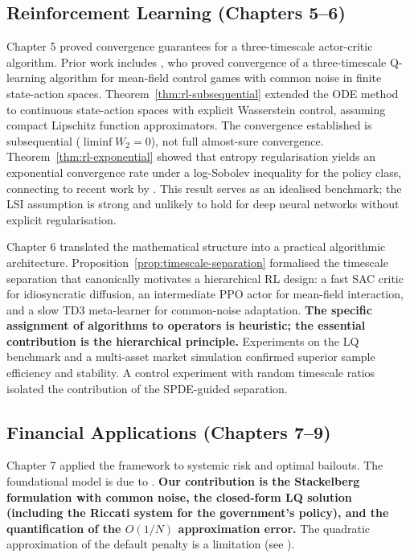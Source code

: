 \subsection{Reinforcement Learning (Chapters 5--6)}

Chapter 5 proved convergence guarantees for a three-timescale actor-critic
algorithm. Prior work includes \citep{angiulietal2024}, who
proved convergence of a three-timescale Q-learning algorithm for mean-field control
games with common noise in finite state-action spaces.
Theorem~\ref{thm:rl-subsequential} extended the ODE method to continuous
state-action spaces with explicit Wasserstein control, assuming compact Lipschitz
function approximators. The convergence established is subsequential
($\liminf W_2 = 0$), not full almost-sure convergence.
Theorem~\ref{thm:rl-exponential} showed that entropy regularisation yields an
exponential convergence rate under a log-Sobolev inequality for the policy class,
connecting to recent work by \citep{malizhang2024}. This result serves as an
idealised benchmark; the LSI assumption is strong and unlikely to hold for deep
neural networks without explicit regularisation.

Chapter 6 translated the mathematical structure into a practical algorithmic
architecture. Proposition~\ref{prop:timescale-separation} formalised the timescale
separation that canonically motivates a hierarchical RL design: a fast SAC critic
for idiosyncratic diffusion, an intermediate PPO actor for mean-field interaction,
and a slow TD3 meta-learner for common-noise adaptation. \textbf{The specific
assignment of algorithms to operators is heuristic; the essential contribution is
the hierarchical principle.} Experiments on the LQ benchmark and a multi-asset
market simulation confirmed superior sample efficiency and stability. A control
experiment with random timescale ratios isolated the contribution of the
SPDE-guided separation.

\subsection{Financial Applications (Chapters 7--9)}

Chapter 7 applied the framework to systemic risk and optimal bailouts. The
foundational model is due to \citep{carmonafouquesun2015}. \textbf{Our
contribution is the Stackelberg formulation with common noise, the closed-form LQ
solution (including the Riccati system for the government's policy), and the
quantification of the $O(1/N)$ approximation error.} The quadratic approximation
of the default penalty is a limitation (see ).

